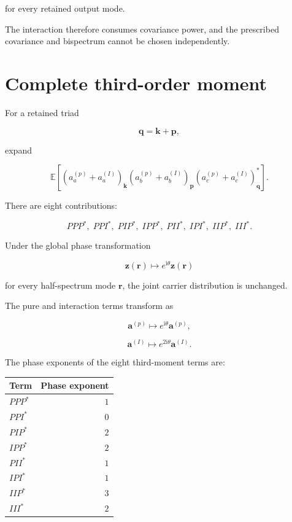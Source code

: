 \documentclass[
  11pt,
  a4paper,
]{article}
\begin{document}
for every retained output mode.

The interaction therefore consumes covariance power, and the prescribed
covariance and bispectrum cannot be chosen independently.

\section{Complete third-order moment}\label{complete-third-order-moment}

For a retained triad

\[
\boldsymbol q=\boldsymbol k+\boldsymbol p,
\]

expand

\[
\mathbb E\!\left[
(a_a^{(p)}+a_a^{(I)})_{\boldsymbol k}
(a_b^{(p)}+a_b^{(I)})_{\boldsymbol p}
(a_c^{(p)}+a_c^{(I)})_{\boldsymbol q}^*
\right].
\]

There are eight contributions:

\[
PPP^*,\;
PPI^*,\;
PIP^*,\;
IPP^*,\;
PII^*,\;
IPI^*,\;
IIP^*,\;
III^*.
\]

Under the global phase transformation

\[
\boldsymbol z(\boldsymbol r)
\longmapsto
e^{\mathrm i\theta}
\boldsymbol z(\boldsymbol r)
\]

for every half-spectrum mode \(\boldsymbol r\), the joint carrier
distribution is unchanged.

The pure and interaction terms transform as

\[
\boldsymbol a^{(p)}
\longmapsto
e^{\mathrm i\theta}\boldsymbol a^{(p)},
\]

\[
\boldsymbol a^{(I)}
\longmapsto
e^{2\mathrm i\theta}\boldsymbol a^{(I)}.
\]

The phase exponents of the eight third-moment terms are:

\begin{longtable}[]{@{}lr@{}}
\toprule\noalign{}
Term & Phase exponent \\
\midrule\noalign{}
\endhead
\bottomrule\noalign{}
\endlastfoot
\(PPP^*\) & \(1\) \\
\(PPI^*\) & \(0\) \\
\(PIP^*\) & \(2\) \\
\(IPP^*\) & \(2\) \\
\(PII^*\) & \(1\) \\
\(IPI^*\) & \(1\) \\
\(IIP^*\) & \(3\) \\
\(III^*\) & \(2\) \\
\end{longtable}
\end{document}
